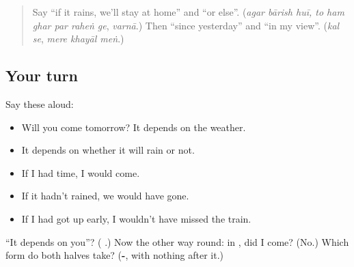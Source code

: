 \begin{quote}
Say \textquotedblleft{}if it rains, we'll stay at home\textquotedblright{} and \textquotedblleft{}or else\textquotedblright{}. (\emph{agar bārish huī, to ham ghar par raheṅ ge}, \emph{varnā}.) Then \textquotedblleft{}since yesterday\textquotedblright{} and \textquotedblleft{}in my view\textquotedblright{}. (\emph{kal se}, \emph{mere khayāl meṅ}.)
\end{quote}

\subsection*{Your turn}
Say these aloud:

\begin{itemize}
\raggedright
  \item Will you come tomorrow? It depends on the weather.
  \item It depends on whether it will rain or not.
  \item If I had time, I would come.
  \item If it hadn't rained, we would have gone.
  \item If I had got up early, I wouldn't have missed the train.
\end{itemize}

\begin{tcolorbox}[breakable,colback=teal!4,colframe=teal!35!black,title={Before you move on}]
\textquotedblleft{}It depends on you\textquotedblright{}? (\textbf{    }.) Now the other way round: in \textbf{     }, did I come? (No.) Which form do both halves take? (\textbf{-}, with nothing after it.)
\end{tcolorbox}
